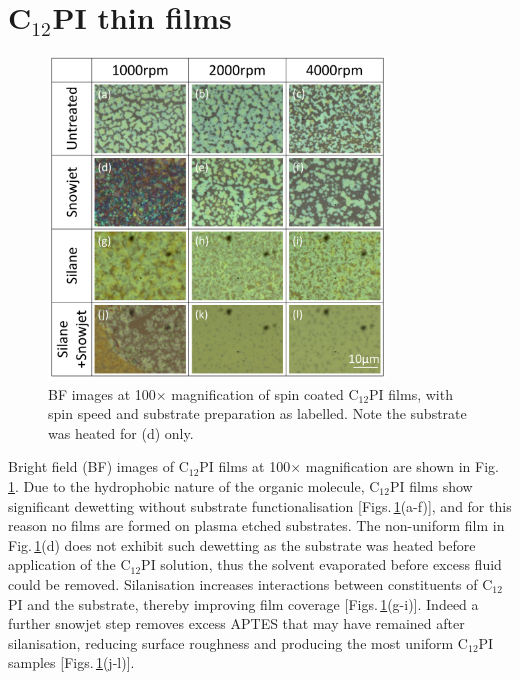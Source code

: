\section{C$_{12}$PI thin films}
\begin{figure}[h!]
\centering    
\includegraphics[width=0.8\textwidth]{Fig1}
\caption{BF images at 100$\times$ magnification of spin coated C$_{12}$PI films, with spin speed and substrate preparation as labelled. Note the substrate was heated for (d) only.}
\label{4Fig1}
\end{figure}
Bright field (BF) images of C$_{12}$PI films at 100$\times$ magnification are shown in Fig.\,\ref{4Fig1}. Due to the hydrophobic nature of the organic molecule, C$_{12}$PI films show significant dewetting without substrate functionalisation [Figs.\,\ref{4Fig1}(a-f)], and for this reason no films are formed on plasma etched substrates. The non-uniform film in Fig.\,\ref{4Fig1}(d) does not exhibit such dewetting as the substrate was heated before application of the C$_{12}$PI solution, thus the solvent evaporated before excess fluid could be removed. Silanisation increases interactions between constituents of C$_{12}$PI and the substrate, thereby improving film coverage [Figs.\,\ref{4Fig1}(g-i)]. Indeed a further snowjet step removes excess APTES that may have remained after silanisation, reducing surface roughness and producing the most uniform C$_{12}$PI samples [Figs.\,\ref{4Fig1}(j-l)].

